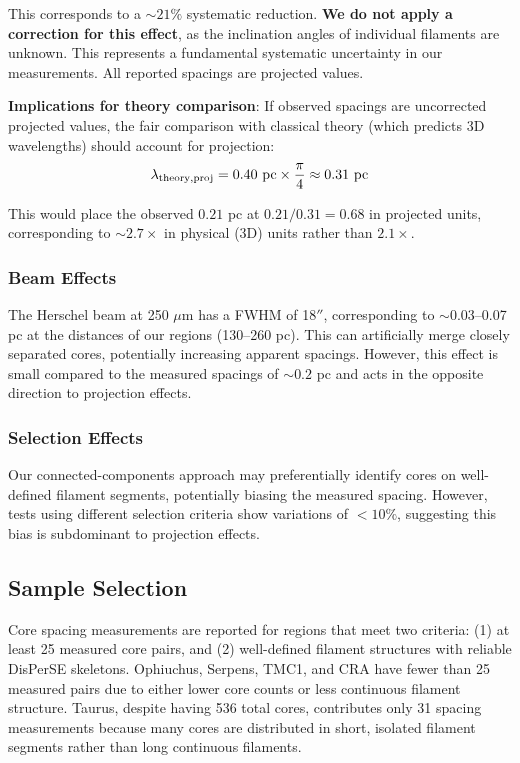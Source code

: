 \documentclass[11pt,a4paper]{article}
\begin{document}
This corresponds to a $\sim21\%$ systematic reduction. \textbf{We do not apply a correction for this effect}, as the inclination angles of individual filaments are unknown. This represents a fundamental systematic uncertainty in our measurements. All reported spacings are projected values.

\textbf{Implications for theory comparison}: If observed spacings are uncorrected projected values, the fair comparison with classical theory (which predicts 3D wavelengths) should account for projection:
\begin{equation}
\lambda_{\rm theory,proj} = 0.40~{\rm pc} \times \frac{\pi}{4} \approx 0.31~{\rm pc}
\end{equation}

This would place the observed $0.21$ pc at $0.21/0.31 = 0.68$ in projected units, corresponding to $\sim2.7\times$ in physical (3D) units rather than $2.1\times$.

\subsubsection{Beam Effects}
The Herschel beam at 250 $\mu$m has a FWHM of 18$''$, corresponding to $\sim0.03$--0.07 pc at the distances of our regions (130--260 pc). This can artificially merge closely separated cores, potentially increasing apparent spacings. However, this effect is small compared to the measured spacings of $\sim0.2$ pc and acts in the opposite direction to projection effects.

\subsubsection{Selection Effects}
Our connected-components approach may preferentially identify cores on well-defined filament segments, potentially biasing the measured spacing. However, tests using different selection criteria show variations of $<10\%$, suggesting this bias is subdominant to projection effects.

\subsection{Sample Selection}

Core spacing measurements are reported for regions that meet two criteria: (1) at least 25 measured core pairs, and (2) well-defined filament structures with reliable DisPerSE skeletons. Ophiuchus, Serpens, TMC1, and CRA have fewer than 25 measured pairs due to either lower core counts or less continuous filament structure. Taurus, despite having 536 total cores, contributes only 31 spacing measurements because many cores are distributed in short, isolated filament segments rather than long continuous filaments.
\end{document}
